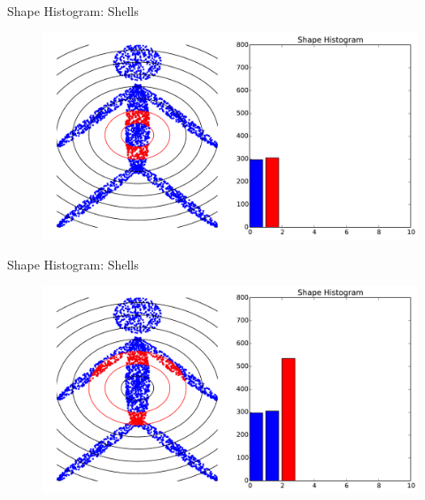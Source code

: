 \documentclass{beamer}
\begin{document}
\begin{frame}{Shape Histogram: Shells}

\begin{figure}[t]
	\centering
    \includegraphics[width=\textwidth]{ShapeHist2.pdf}
\end{figure}

\end{frame}

\begin{frame}{Shape Histogram: Shells}

\begin{figure}[t]
	\centering
    \includegraphics[width=\textwidth]{ShapeHist3.pdf}
\end{figure}

\end{frame}
\end{document}
